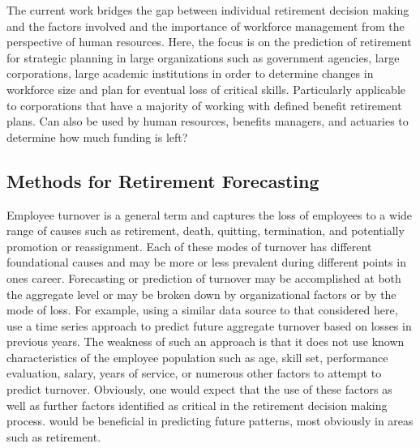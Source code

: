 \documentclass[12pt,letterpaper]{article}
\begin{document}
The current work bridges the gap between individual retirement decision making and the factors involved and the importance of workforce management from the perspective of human resources.  Here, the focus is on the prediction of retirement for strategic planning in large organizations such as government agencies, large corporations, large academic institutions in order to determine changes in workforce size and plan for eventual loss of critical skills. Particularly applicable to corporations that have a majority of working with defined benefit retirement plans.  Can also be used by human resources, benefits managers, and actuaries to determine how much funding is left?

\subsection{Methods for Retirement Forecasting}

Employee turnover is a general term and captures the loss of employees to a wide range of causes such as retirement, death, quitting, termination, and potentially promotion or reassignment. Each of these modes of turnover has different foundational causes and may be more or less prevalent during different points in ones career.  Forecasting or prediction of turnover may be accomplished at both the aggregate level or may be broken down by organizational factors or by the mode of loss.  For example, using a similar data source to that considered here, \citet{zhu2015} use a time series approach to predict future aggregate turnover based on losses in previous years.  The weakness of such an approach is that it does not use known characteristics of the employee population such as age, skill set, performance evaluation, salary, years of service, or numerous other factors to attempt to predict turnover.  Obviously, one would expect that the use of these factors as well as further factors identified as critical in the retirement decision making process. \citet{Wang2010} would be beneficial in predicting future patterns, most obviously in areas such as retirement.
\end{document}
